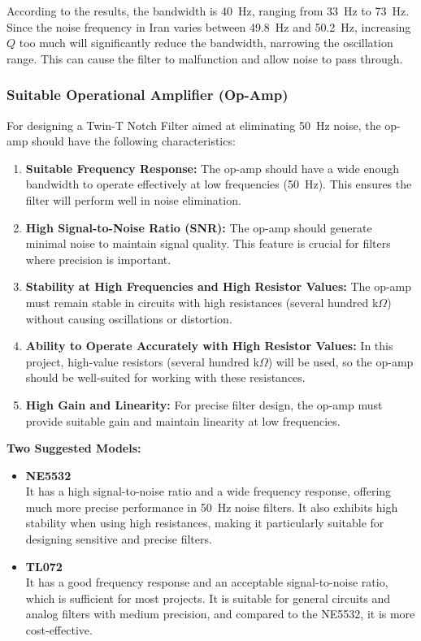 \documentclass[hidelinks,12pt]{article}
\begin{document}
	According to the results, the bandwidth is 40~Hz, ranging from 33~Hz to 73~Hz. Since the noise frequency in Iran varies between 49.8~Hz and 50.2~Hz, increasing \( Q \) too much will significantly reduce the bandwidth, narrowing the oscillation range. This can cause the filter to malfunction and allow noise to pass through.
	
	\pagebreak
	
	\subsubsection{Suitable Operational Amplifier (Op-Amp)}

	For designing a Twin-T Notch Filter aimed at eliminating 50~Hz noise, the op-amp should have the following characteristics:
	

	\begin{enumerate}
		\item \textbf{Suitable Frequency Response:} The op-amp should have a wide enough bandwidth to operate effectively at low frequencies (50~Hz). This ensures the filter will perform well in noise elimination.
		\item \textbf{High Signal-to-Noise Ratio (SNR):} The op-amp should generate minimal noise to maintain signal quality. This feature is crucial for filters where precision is important.
		\item \textbf{Stability at High Frequencies and High Resistor Values:} The op-amp must remain stable in circuits with high resistances (several hundred k$\Omega$) without causing oscillations or distortion.
		\item \textbf{Ability to Operate Accurately with High Resistor Values:} In this project, high-value resistors (several hundred k$\Omega$) will be used, so the op-amp should be well-suited for working with these resistances.
		\item \textbf{High Gain and Linearity:} For precise filter design, the op-amp must provide suitable gain and maintain linearity at low frequencies.
	\end{enumerate}

	\textbf{Two Suggested Models:}

	\begin{itemize}
		\item \textbf{NE5532} \\
		It has a high signal-to-noise ratio and a wide frequency response, offering much more precise performance in 50~Hz noise filters. It also exhibits high stability when using high resistances, making it particularly suitable for designing sensitive and precise filters.
		
		\item \textbf{TL072} \\
		It has a good frequency response and an acceptable signal-to-noise ratio, which is sufficient for most projects. It is suitable for general circuits and analog filters with medium precision, and compared to the NE5532, it is more cost-effective.
	\end{itemize}
\end{document}

